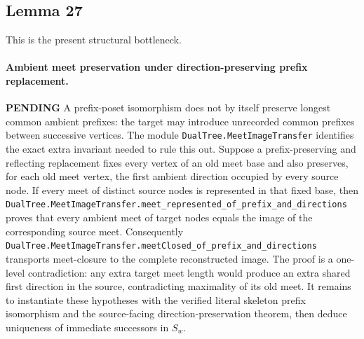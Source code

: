 \documentclass[11pt]{article}
\newcommand{\todo}{\textcolor{gray!70!black}{\textbf{PENDING}}}
\newcommand{\lean}[1]{\texttt{#1}}
\begin{document}
\subsection{Lemma 27}
This is the present structural bottleneck.
\paragraph{Ambient meet preservation under direction-preserving prefix replacement.} \todo
A prefix-poset isomorphism does not by itself preserve longest common
ambient prefixes: the target may introduce unrecorded common prefixes
between successive vertices.  The module
\lean{DualTree.MeetImageTransfer} identifies the exact extra invariant
needed to rule this out.  Suppose a prefix-preserving and reflecting
replacement fixes every vertex of an old meet base and also preserves,
for each old meet vertex, the first ambient direction occupied by
every source node.  If every meet of distinct source nodes is represented
in that fixed base, then
\lean{DualTree.MeetImageTransfer.meet_represented_of_prefix_and_directions}
proves that every ambient meet of target nodes equals the image of
the corresponding source meet.
Consequently
\lean{DualTree.MeetImageTransfer.meetClosed_of_prefix_and_directions}
transports meet-closure to the complete reconstructed image.
The proof is a one-level contradiction: any extra target meet length
would produce an extra shared first direction in the source,
contradicting maximality of its old meet.
It remains to instantiate these hypotheses with the verified
literal skeleton prefix isomorphism and the source-facing
direction-preservation theorem, then deduce uniqueness of immediate
successors in $S_w$.
\end{document}
